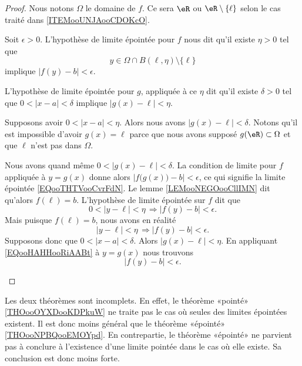 \begin{proof}
	Nous notons \( \Omega\) le domaine de \( f\). Ce sera \( \eR\) ou \( \eR\setminus\{ \ell \}\) selon le cas traité dans \ref{ITEMooUNJAooCDOKcO}.

	Soit \( \epsilon>0\). L'hypothèse de limite épointée pour \( f\) nous dit qu'il existe \( \eta>0\) tel que
	\begin{equation}
		y\in\Omega\cap B(\ell,\eta)\setminus\{ \ell \}
	\end{equation}
	implique \( | f(y)-b |<\epsilon\).

	L'hypothèse de limite épointée pour \( g\), appliquée à ce \( \eta\) dit qu'il existe \( \delta>0\) tel que \( 0<| x-a |<\delta\) implique \( | g(x)-\ell |<\eta\).

	\begin{subproof}
		Supposons avoir \( 0<| x-a |<\eta\). Alors nous avons \( | g(x)-\ell |<\delta\). Notons qu'il est impossible d'avoir \( g(x)=\ell\) parce que nous avons supposé \( g(\eR)\subset \Omega\) et que \( \ell\) n'est pas dans \( \Omega\).

		Nous avons quand même \( 0<| g(x)-\ell |<\delta\). La condition de limite pour \( f\) appliquée à \( y=g(x)\) donne alors \( | f\big( g(x) \big)-b |<\epsilon\), ce qui signifie la limite épointée \eqref{EQooTHTVooCvrFdN}.
		Le lemme \ref{LEMooNEGOooCllIMN} dit qu'alors \( f(\ell)=b\). L'hypothèse de limite épointée sur \( f\) dit que
		\begin{equation}
			0<| y-\ell |<\eta\,\Rightarrow | f(y)-b |<\epsilon.
		\end{equation}
		Mais puisque \( f(\ell)=b\), nous avons en réalité
		\begin{equation}        \label{EQooHAHHooRiAABt}
			| y-\ell |<\eta\,\Rightarrow | f(y)-b |<\epsilon.
		\end{equation}
		Supposons donc que \( 0<|x-a  |<\delta\). Alors \( | g(x)-\ell |<\eta\). En appliquant \eqref{EQooHAHHooRiAABt} à \( y=g(x)\) nous trouvons
		\begin{equation}
			| f(y)-b |<\epsilon.
		\end{equation}
	\end{subproof}
\end{proof}

\begin{normaltext}      \label{NORMooSLAJooLfDreV}
	Les deux théorèmes sont incomplets. En effet, le théorème «pointé» \ref{THOooOYXDooKDPkuW} ne traite pas le cas où seules des limites épointées existent. Il est donc moins général que le théorème «épointé» \ref{THOooNPBQooEMOYpd}. En contrepartie, le théorème «épointé» ne parvient pas à conclure à l'existence d'une limite pointée dans le cas où elle existe. Sa conclusion est donc moins forte.
\end{normaltext}

